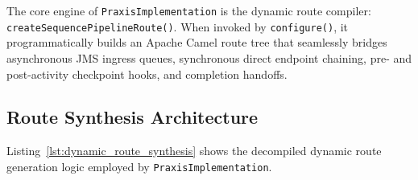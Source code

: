 The core engine of \texttt{PraxisImplementation} is the dynamic route compiler: \texttt{createSequencePipelineRoute()}. When invoked by \texttt{configure()}, it programmatically builds an Apache Camel route tree that seamlessly bridges asynchronous JMS ingress queues, synchronous direct endpoint chaining, pre- and post-activity checkpoint hooks, and completion handoffs.

\subsection{Route Synthesis Architecture}
\label{subsec:routing_synthesis}

Listing~\ref{lst:dynamic_route_synthesis} shows the decompiled dynamic route generation logic employed by \texttt{PraxisImplementation}.


